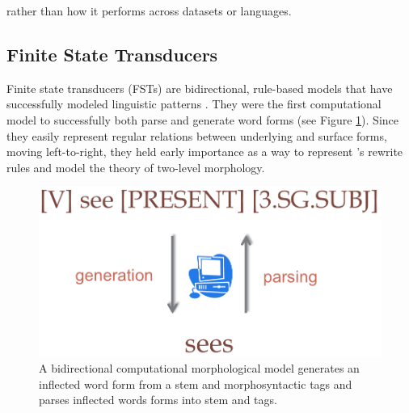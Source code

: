 \documentclass[12pt]{article}
\begin{document}
rather than how it performs across datasets or languages. 

\subsection{Finite State Transducers}

Finite state transducers (FSTs) are bidirectional, rule-based models that have successfully modeled linguistic patterns \cite{koskenniemi_two-level_1983,beesley_finite-state_2003,hulden_finite-state_2009}. They were the first computational model to successfully both parse and generate word forms \cite{goodman_generation_2013} (see Figure \ref{fig:bidir}). Since they easily represent regular relations between underlying and surface forms, moving left-to-right, they held early importance as a way to represent 's  rewrite rules \cite{karttunen_2005} and model the theory of two-level morphology.
\bigskip

\begin{figure}[ht]
\label{fig:bidir}
\begin{center}
\includegraphics[width=0.5\columnwidth]{bidirectional.PNG}
\caption{A bidirectional computational morphological model generates an inflected word form from a stem and morphosyntactic tags and parses inflected words forms into stem and tags.}
\end{center}
\end{figure}
\end{document}
